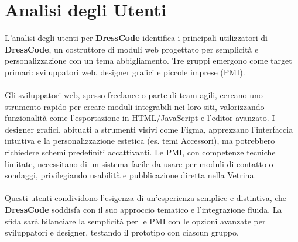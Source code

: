 \section{\huge Analisi degli Utenti}
L'analisi degli utenti per \textbf{DressCode} identifica i principali utilizzatori di \textbf{DressCode}, un costruttore di moduli web progettato per semplicità e personalizzazione con un tema abbigliamento. Tre gruppi emergono come target primari: sviluppatori web, designer grafici e piccole imprese (PMI).
\\\\
Gli sviluppatori web, spesso freelance o parte di team agili, cercano uno strumento rapido per creare moduli integrabili nei loro siti, valorizzando funzionalità come l'esportazione in HTML/JavaScript e l'editor avanzato. I designer grafici, abituati a strumenti visivi come Figma, apprezzano l'interfaccia intuitiva e la personalizzazione estetica (es. temi Accessori), ma potrebbero richiedere schemi predefiniti accattivanti. Le PMI, con competenze tecniche limitate, necessitano di un sistema facile da usare per moduli di contatto o sondaggi, privilegiando usabilità e pubblicazione diretta nella Vetrina.
\\\\
Questi utenti condividono l'esigenza di un'esperienza semplice e distintiva, che \textbf{DressCode} soddisfa con il suo approccio tematico e l'integrazione fluida. La sfida sarà bilanciare la semplicità per le PMI con le opzioni avanzate per sviluppatori e designer, testando il prototipo con ciascun gruppo.

